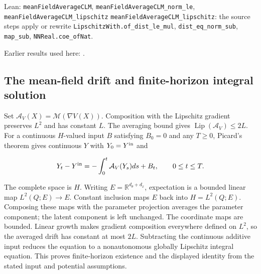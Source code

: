 \documentclass[11pt,a4paper]{report}
\begin{document}
\begin{leanbox}{Lean: \texttt{meanFieldAverageCLM}, \texttt{meanFieldAverageCLM\_\allowbreak{}norm\_\allowbreak{}le}, \texttt{meanFieldAverageCLM\_\allowbreak{}lipschitz}}
\texttt{mean\allowbreak{}Field\allowbreak{}Average\allowbreak{}CLM\_\allowbreak{}lipschitz}: the source steps apply or rewrite \texttt{Lipschitz\allowbreak{}With.\allowbreak{}of\_\allowbreak{}dist\_\allowbreak{}le\_\allowbreak{}mul}, \texttt{dist\_\allowbreak{}eq\_\allowbreak{}norm\_\allowbreak{}sub}, \texttt{map\_\allowbreak{}sub}, \texttt{NNReal.\allowbreak{}coe\_\allowbreak{}of\allowbreak{}Nat}.
\end{leanbox}


Earlier results used here: \cite[Section~3.1.1]{LangevinLean2026IPLA}.
\subsection{\texorpdfstring{The mean-field drift and finite-horizon integral solution}{The mean-field drift and finite-horizon integral solution}}
\label{report-step-ProximalLangevin-MeanFieldProcess-lean-5}


Set \(\mathcal A_V(X)=\mathcal M(\nabla V(X))\). Composition with the Lipschitz gradient preserves \(L^2\) and has constant \(L\). The averaging bound gives \(\operatorname{Lip}(\mathcal A_V)\le2L\). For a continuous \(H\)-valued input \(B\) satisfying \(B_0=0\) and any \(T\ge0\), Picard’s theorem gives continuous \(Y\) with \(Y_0=Y^{\rm in}\) and

\[Y_t-Y^{\rm in}=-\int_0^t\mathcal A_V(Y_s)ds+B_t,\qquad0\le t\le T.\]

The complete space is \(H\). Writing \(E=\mathbb R^{d_\theta+d_x}\), expectation is a bounded linear map \(L^2(Q;E)\to E\). Constant inclusion maps \(E\) back into \(H=L^2(Q;E)\). Composing these maps with the parameter projection averages the parameter component; the latent component is left unchanged. The coordinate maps are bounded. Linear growth makes gradient composition everywhere defined on \(L^2\), so the averaged drift has constant at most \(2L\). Subtracting the continuous additive input reduces the equation to a nonautonomous globally Lipschitz integral equation. This proves finite-horizon existence and the displayed identity from the stated input and potential assumptions.
\end{document}
